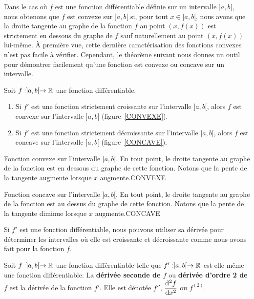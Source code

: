 {Dans le cas où $f$ est une fonction différentiable définie sur un
intervalle $]a,b[$, nous obtenons que $f$ est convexe sur $]a,b[$ si, pour
tout $x \in ]a,b[$, nous avons que la droite tangente au graphe de la
fonction $f$ au point $(x,f(x))$ est strictement en dessous du graphe
de $f$ sauf naturellement au point $(x,f(x))$ lui-même.  À première
vue, cette dernière caractérisation des fonctions convexes n'est pas
facile à vérifier.  Cependant, le théorème suivant nous donnes un
outil pour démontrer facilement qu'une fonction est convexe ou concave
sur un intervalle.

\begin{prop}
Soit $f:]a,b[\to \mathbb{R}$ une fonction différentiable.
\begin{enumerate}
\item Si $f'$ est une fonction strictement croissante sur l'intervalle
$]a,b[$, alors $f$ est convexe sur l'intervalle $]a,b[$
(figure~\ref{CONVEXE}).
\item Si $f'$ est une fonction strictement décroissante sur
l'intervalle $]a,b[$, alors $f$ est concave sur l'intervalle $]a,b[$
(figure~\ref{CONCAVE}).
\end{enumerate}
\end{prop}

{Fonction convexe sur l'intervalle $]a,b[$.  En tout point, le droite
tangente au graphe de la fonction est en dessous du graphe de cette
fonction.  Notons que la pente de la tangente augmente lorsque $x$
augmente.}{CONVEXE}

{Fonction concave sur l'intervalle $]a,b[$.  
En tout point, le droite tangente au graphe de la fonction est au
dessus du graphe de cette fonction.  Notons que la pente de la
tangente diminue lorsque $x$ augmente.}{CONCAVE}

Si $f'$ est une fonction différentiable, nous pouvons utiliser sa dérivée
pour déterminer les intervalles où elle est croissante et décroissante
comme nous avons fait pour la fonction $f$.

\begin{defn}
Soit $f:]a,b[\rightarrow \mathbb{R}$ une fonction différentiable telle que
$f':]a,b[\to \mathbb{R}$ est elle même une fonction différentiable.  La
{\bfseries dérivée seconde de $f$} ou {\bfseries dérivée d'ordre 2 de $f$} 
est la dérivée de la fonction $f'$.  Elle est dénotée $f''$,
$\displaystyle \frac{\mathrm{d}^{2}f}{\mathrm{d}x^{2}}$ ou $f^{(2)}$.


\end{defn}}
